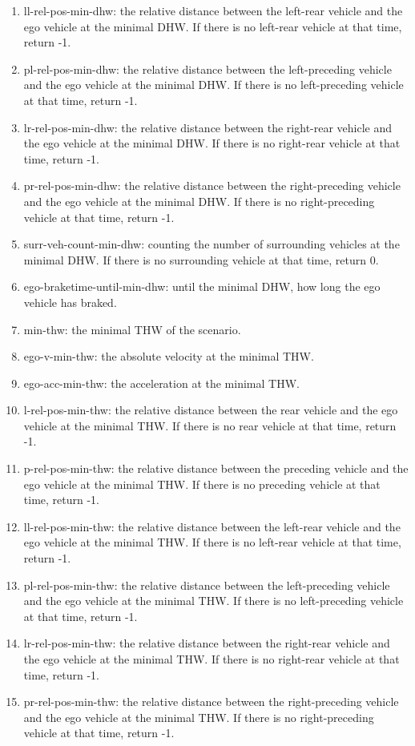 \documentclass[conference]{IEEEtran}
\begin{document}
\begin{enumerate}
\item ll-rel-pos-min-dhw: the relative distance between the left-rear vehicle and the ego vehicle at the minimal DHW. If there is no left-rear vehicle at that time, return -1.
\item pl-rel-pos-min-dhw: the relative distance between the left-preceding vehicle and the ego vehicle at the minimal DHW. If there is no left-preceding vehicle at that time, return -1.
\item lr-rel-pos-min-dhw: the relative distance between the right-rear vehicle and the ego vehicle at the minimal DHW. If there is no right-rear vehicle at that time, return -1.
\item pr-rel-pos-min-dhw: the relative distance between the right-preceding vehicle and the ego vehicle at the minimal DHW. If there is no right-preceding vehicle at that time, return -1.
\item surr-veh-count-min-dhw: counting the number of surrounding vehicles at the minimal DHW. If there is no surrounding vehicle at that time, return 0.
\item ego-braketime-until-min-dhw: until the minimal DHW, how long the ego vehicle has braked.
\item min-thw: the minimal THW of the scenario.
\item ego-v-min-thw: the absolute velocity at the minimal THW.
\item ego-acc-min-thw: the acceleration at the minimal THW.
\item l-rel-pos-min-thw: the relative distance between the rear vehicle and the ego vehicle at the minimal THW. If there is no rear vehicle at that time, return -1.
\item p-rel-pos-min-thw: the relative distance between the preceding vehicle and the ego vehicle at the minimal THW. If there is no preceding vehicle at that time, return -1.
\item ll-rel-pos-min-thw: the relative distance between the left-rear vehicle and the ego vehicle at the minimal THW. If there is no left-rear vehicle at that time, return -1.
\item pl-rel-pos-min-thw: the relative distance between the left-preceding vehicle and the ego vehicle at the minimal THW. If there is no left-preceding vehicle at that time, return -1.
\item lr-rel-pos-min-thw: the relative distance between the right-rear vehicle and the ego vehicle at the minimal THW. If there is no right-rear vehicle at that time, return -1.
\item pr-rel-pos-min-thw: the relative distance between the right-preceding vehicle and the ego vehicle at the minimal THW. If there is no right-preceding vehicle at that time, return -1.

\end{enumerate}
\end{document}
